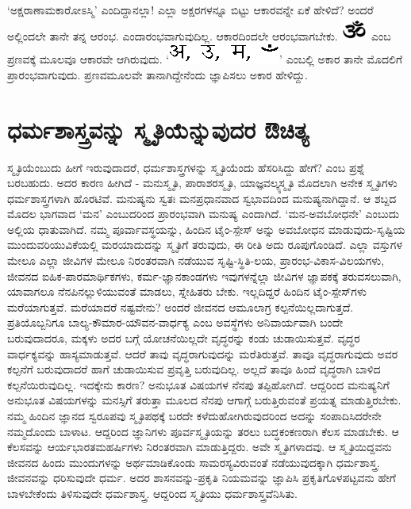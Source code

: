 `ಅಕ್ಷರಾಣಾಮಕಾರೋಽಸ್ಮಿ' ಎಂದಿದ್ದಾನಲ್ಲಾ! ಎಲ್ಲಾ ಅಕ್ಷರಗಳನ್ನೂ ಬಿಟ್ಟು ಆಕಾರವನ್ನೇ ಏಕೆ ಹೇಳಿದೆ? ಅಂದರೆ ಅಲ್ಲಿಂದಲೇ ತಾನೇ ತನ್ನ ಆರಂಭ. {} ಎಂದಾರಂಭವಾಗುವುದಿಲ್ಲ. ಆಕಾರದಿಂದಲೇ ಆರಂಭವಾಗಬೇಕು. \includegraphics{Om-PNG.eps} ಎಂಬ ಪ್ರಣವಕ್ಕೆ ಮೂಲವೂ ಆಕಾರವೇ ಆಗಿರುವುದು. `\includegraphics{symbol.eps}' ಎಂಬಲ್ಲಿ ಅಕಾರ ತಾನೇ ಮೊದಲಿಗೆ ಪ್ರಾರಂಭವಾಗುವುದು. ಪ್ರಣವಮೂಲವೇ ತಾನಾಗಿದ್ದೇನೆಂದು ಜ್ಞಾಪಿಸಲು ಅಕಾರ ಹೇಳಿದ್ದು. 

\section*{ಧರ್ಮಶಾಸ್ತ್ರವನ್ನು ಸ್ಮೃತಿಯೆನ್ನುವುದರ ಔಚಿತ್ಯ}

ಸ್ಮೃತಿಯೆಂಬುದು ಹೀಗೆ ಇರುವುದಾದರೆ, ಧರ್ಮಶಾಸ್ತ್ರಗಳನ್ನು ಸ್ಮೃತಿಯೆಂದು ಹೆಸರಿಸಿದ್ದು ಹೇಗೆ? ಎಂಬ ಪ್ರಶ್ನೆ ಬರಬಹುದು. ಅದರ ಕಾರಣ ಹೀಗಿದೆ - ಮನುಸ್ಮೃತಿ, ಪಾರಾಶರಸ್ಮೃತಿ, ಯಾಜ್ಞವಲ್ಕ್ಯಸ್ಮೃತಿ ಮೊದಲಾಗಿ ಅನೇಕ ಸ್ಮೃತಿಗಳು ಧರ್ಮಶಾಸ್ತ್ರಗಳಾಗಿ ಹೊರಟಿವೆ. ಮನುಷ್ಯನು ಸ್ವತಃ ಮನಪ್ರಧಾನವಾದ ಸ್ವಭಾವದಿಂದ ಮನುಷ್ಯನಾಗಿದ್ದಾನೆ. ಆ ಶಬ್ದದ ಮೊದಲ ಭಾಗವಾದ `ಮನ' ಎಂಬುದರಿಂದ ಪ್ರಾರಂಭವಾಗಿ ಮನುಷ್ಯ ಎಂದಾಗಿದೆ. `ಮನ-ಅವಬೋಧನೇ' ಎಂಬುದು ಅಲ್ಲಿಯ ಧಾತುವಾಗಿದೆ. ನಮ್ಮ ಪೂರ್ವಾವಸ್ಥಯನ್ನು, ಹಿಂದಿನ ಟೈಂ-ಸ್ಪೇಸ್ ಅನ್ನು ಅವಬೋಧನ ಮಾಡುವುದು-ಸೃಷ್ಟಿಯ ಮುಂದುವರಿಯುವಿಕೆಯಲ್ಲಿ ಮರಯಾದುದನ್ನು ಸ್ಮೃತಿಗೆ ತರುವುದು, ಈ ರೀತಿ ಅದು ರೂಪುಗೊಂಡಿದೆ. ಎಲ್ಲಾ ವಸ್ತುಗಳ ಮೇಲೂ ಎಲ್ಲಾ ಜೀವಿಗಳ ಮೇಲೂ ನಿರಂತರವಾಗಿ ನಡೆಯುವ ಸೃಷ್ಟಿ-ಸ್ಥಿತಿ-ಲಯ, ಪ್ರಾರಂಭ-ವಿಕಾಸ-ವಿಲಯಗಳು, ಜೀವನದ ಐಹಿಕ-ಪಾರಮಾರ್ಥಿಕಗಳು, ಕರ್ಮ-ಜ್ಞಾನಕಾಂಡಗಳು ಇವುಗಳನ್ನೆಲ್ಲಾ ಜೀವಿಗಳ ಜ್ಞಾಪಕಕ್ಕೆ ತರುವಸಲುವಾಗಿ, ಯಾವಾಗಲೂ ನೆನಪಿನಲ್ಲುಳಿಯುವಂತೆ ಮಾಡಲು, ಸ್ನೇಹಿತರು ಬೇಕು. ಇಲ್ಲದಿದ್ದರೆ ಹಿಂದಿನ ಟೈಂ-ಸ್ಪೇಸ್‌ಗಳು ಮರೆಯಾಗುತ್ತವೆ. ಮರೆಯಾದರೆ ನಷ್ಟವೇನು? ಅಂದರೆ ಜೀವನದ ಆಮೂಲಾಗ್ರ ಕಲ್ಪನೆಯಿಲ್ಲದಾಗುತ್ತದೆ. ಪ್ರತಿಯೊಬ್ಬನಿಗೂ ಬಾಲ್ಯ-ಕೌಮಾರ-ಯೌವನ-ವಾರ್ಧಕ್ಯ ಎಂಬ ಅವಸ್ಥೆಗಳು ಅನಿವಾರ್ಯವಾಗಿ ಬಂದೇ ಬರುವುದಾದರೂ, ಮಕ್ಕಳು ಅದರ ಬಗ್ಗೆ ಯೋಚನೆಯಿಲ್ಲದೇ ವೃದ್ಧರನ್ನು ಕಂಡು ಚುಡಾಯಿಸುತ್ತವೆ. ವೃದ್ಧರ ವಾರ್ಧಕ್ಯವನ್ನು ಹಾಸ್ಯಮಾಡುತ್ತವೆ. ಆದರೆ ತಾವು ವೃದ್ಧರಾಗುವುದನ್ನು ಮರೆತಿರುತ್ತವೆ. ತಾವೂ ವೃದ್ಧರಾಗುವುದು ಅವರ ಕಲ್ಪನೆಗೆ ಬರುವುದಾದರೆ ಹಾಗೆ ಚುಡಾಯಿಸುವ ಪ್ರವೃತ್ತಿ ಬರುವುದಿಲ್ಲ. ಅಲ್ಲದೆ ತಾವೂ ಹಿಂದೆ ವೃದ್ಧರಾಗಿ ಬಾಳಿದ ಕಲ್ಪನೆಯಿರುವುದಿಲ್ಲ. ಇದಕ್ಕೇನು ಕಾರಣ? ಅನುಭೂತ ವಿಷಯಗಳ ನೆನಪು ತಪ್ಪಿಹೋಗಿದೆ. ಆದ್ದರಿಂದ ಮನುಷ್ಯನಿಗೆ ಅನುಭೂತ ವಿಷಯಗಳನ್ನು ಮನಸ್ಸಿಗೆ ತರುತ್ತಾ ಮೂಲದ ನೆನಪು ಆಗಾಗ್ಗೆ ಬರುತ್ತಿರುವಂತೆ ಪ್ರಯತ್ನ ಮಾಡುತ್ತಿರಬೇಕು. ನಮ್ಮ ಹಿಂದಿನ ಜ್ಞಾನದ ಸ್ವರೂಪವು ಸ್ಮೃತಿಪಥಕ್ಕೆ ಬರದೇ ಕಳೆದುಹೋಗಿರುವುದರಿಂದ ಅದನ್ನು ಸಂಪಾದಿಸಿದರೇನೇ ನಮ್ಮದೊಂದು ಬಾಳಾಟ. ಆದ್ದರಿಂದ ಜ್ಞಾನಿಗಳು ಪೂರ್ವಸ್ಮೃತಿಯನ್ನು ತರಲು ಬದ್ಧಕಂಕಣರಾಗಿ ಕೆಲಸ ಮಾಡಬೇಕು. ಆ ಕೆಲಸವನ್ನು ಆರ್ಯಭಾರತಮಹರ್ಷಿಗಳು ನಿರಂತರವಾಗಿ ಮಾಡುತ್ತಿದ್ದರು. ಅವೇ ಸ್ಮೃತಿಗಳಾದವು. ಆ ಸ್ಮೃತಿಯಿದ್ದವನು ಜೀವನದ ಹಿಂದು ಮುಂದುಗಳನ್ನು ಅರ್ಥಮಾಡಿಕೊಂಡು ಸಾಮರಸ್ಯವಿರುವಂತೆ ನಡೆಯುವುದಕ್ಕಾಗಿ ಧರ್ಮಶಾಸ್ತ್ರ. ಜೀವನವನ್ನು ಧರಿಸುವುದೇ ಧರ್ಮ. ಅದರ ಶಾಸನವನ್ನು-ಪ್ರಕೃತಿ ನಿಯಮವನ್ನು ಜ್ಞಾಪಿಸಿ ಪ್ರಕೃತಿಗೊಳಪಟ್ಟವನು ಹೇಗೆ ಬಾಳಬೇಕೆಂದು ತಿಳಿಸುವುದೇ ಧರ್ಮಶಾಸ್ತ್ರ. ಆದ್ದರಿಂದ ಸ್ಮೃತಿಯು ಧರ್ಮಶಾಸ್ತ್ರವೆನಿಸಿತು.

